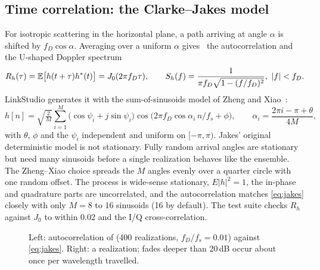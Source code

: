 \subsection{Time correlation: the Clarke--Jakes model}
For isotropic scattering in the horizontal plane, a path arriving at angle $\alpha$ is shifted
by $f_D\cos\alpha$. Averaging over a uniform $\alpha$ gives~\cite{clarke1968} the autocorrelation and the U-shaped
Doppler spectrum
\begin{equation}
  R_h(\tau)=\mathbb{E}\big[h(t+\tau)h^{*}(t)\big]=J_0(2\pi f_D\tau),\qquad
  S_h(f)=\frac{1}{\pi f_D\sqrt{1-(f/f_D)^2}},\ |f|<f_D .
  \label{eq:jakes}
\end{equation}
LinkStudio generates it with the sum-of-sinusoids model of Zheng and Xiao~\cite{zheng2003}:
\begin{equation}
  h[n]=\sqrt{\tfrac{2}{M}}\sum_{i=1}^{M}\big(\cos\psi_i+j\sin\psi_i\big)\cos\!\big(2\pi f_D\cos\alpha_i\,n/f_s+\phi\big),
  \qquad \alpha_i=\frac{2\pi i-\pi+\theta}{4M},
\end{equation}
with $\theta$, $\phi$ and the $\psi_i$ independent and uniform on $[-\pi,\pi)$. Jakes' original
deterministic model is not stationary. Fully random arrival angles are stationary but need many
sinusoids before a single realization behaves like the ensemble. The Zheng--Xiao choice spreads
the $M$ angles evenly over a quarter circle with one random offset. The process is wide-sense
stationary, $E|h|^2=1$, the in-phase and quadrature parts are uncorrelated, and the
autocorrelation matches \cref{eq:jakes} closely with only $M=8$ to 16 sinusoids (16 by default).
The test suite checks $R_h$ against $J_0$ to within 0.02 and the I/Q cross-correlation.

\begin{figure}[htbp]
\centering
{}
\caption{Left: autocorrelation of  (400 realizations, $f_D/f_s=0.01$)
against \cref{eq:jakes}. Right: a realization; fades deeper than 20\,dB occur about once per
wavelength travelled.}
\label{fig:jakes}
\end{figure}

